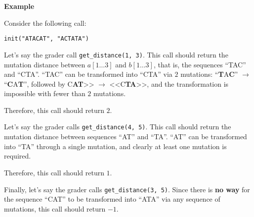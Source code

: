\textbf{Example}

Consider the following call:

\texttt{init("ATACAT", "ACTATA")}

Let's say the grader call \texttt{get\_distance(1, 3)}.
This call should return the mutation distance
between $a[1\ldots 3]$ and $b[1\ldots 3]$, that is, the sequences ``TAC'' and ``CTA''. ``TAC'' can be transformed into ``CTA'' via $2$ mutations: ``\textbf{T}A\textbf{C}'' $\rightarrow$ ``\textbf{C}A\textbf{T}'', followed by C\textbf{AT}>> $\rightarrow$ <<C\textbf{TA}>>, and the transformation is impossible with fewer than $2$ mutations.

Therefore, this call should return $2$.

Let's say the grader calls \texttt{get\_distance(4, 5)}.
This call should return the mutation distance
between sequences ``AT'' and ``TA''. ``AT'' can be transformed into ``TA'' through a single mutation, and
clearly at least one mutation is required.

Therefore, this call should return $1$.

Finally, let's say the grader calls \texttt{get\_distance(3, 5)}. Since there is \textbf{no way} for the sequence ``CAT'' to be transformed into ``ATA'' via any sequence of mutations, this call should return $-1$.

